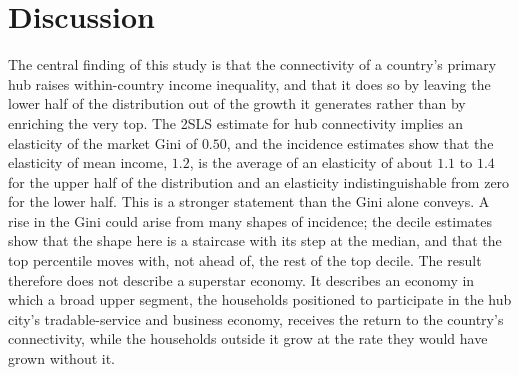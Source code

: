 \section{Discussion}
\label{sec:discussion}
The central finding of this study is that the connectivity of a country's primary hub raises within-country income inequality, and that it does so by leaving the lower half of the distribution out of the growth it generates rather than by enriching the very top. The 2SLS estimate for hub connectivity implies an elasticity of the market Gini of $0.50$, and the incidence estimates show that the elasticity of mean income, $1.2$, is the average of an elasticity of about $1.1$ to $1.4$ for the upper half of the distribution and an elasticity indistinguishable from zero for the lower half. This is a stronger statement than the Gini alone conveys. A rise in the Gini could arise from many shapes of incidence; the decile estimates show that the shape here is a staircase with its step at the median, and that the top percentile moves with, not ahead of, the rest of the top decile. The result therefore does not describe a superstar economy. It describes an economy in which a broad upper segment, the households positioned to participate in the hub city's tradable-service and business economy, receives the return to the country's connectivity, while the households outside it grow at the rate they would have grown without it.

